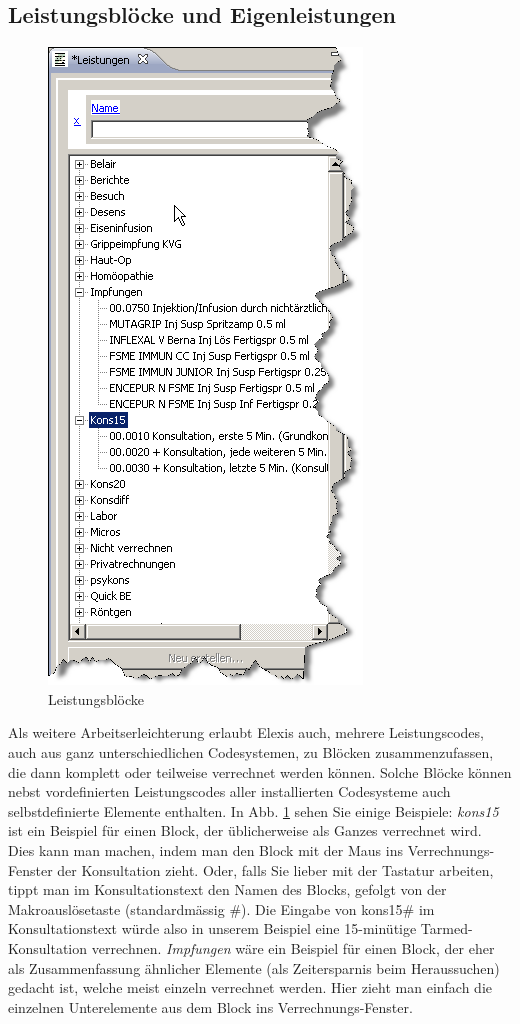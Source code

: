 \subsection{Leistungsblöcke und Eigenleistungen}
\begin{figure}
\includegraphics{images/block1}
\caption{Leistungsblöcke}
\label{fig:bloecke}
\end{figure}
Als weitere Arbeitserleichterung erlaubt Elexis auch, mehrere Leistungscodes, auch aus ganz unterschiedlichen Codesystemen, zu Blöcken zusammenzufassen, die dann komplett oder teilweise verrechnet werden können. Solche Blöcke können nebst vordefinierten Leistungscodes aller installierten Codesysteme auch selbstdefinierte Elemente enthalten. In Abb. \ref{fig:bloecke} sehen Sie einige Beispiele: \textit{kons15} ist ein Beispiel für einen Block, der üblicherweise als Ganzes verrechnet wird. Dies kann man machen, indem man den Block mit der Maus ins Verrechnungs-Fenster der Konsultation zieht. Oder, falls Sie lieber mit der Tastatur arbeiten, tippt man im Konsultationstext den Namen des Blocks, gefolgt von der Makroauslösetaste (standardmässig \#). Die Eingabe von kons15\# im Konsultationstext würde also in unserem Beispiel eine 15-minütige Tarmed-Konsultation verrechnen. \textit{Impfungen} wäre ein Beispiel für einen Block, der eher als Zusammenfassung ähnlicher Elemente (als Zeitersparnis beim Heraussuchen) gedacht ist, welche meist einzeln verrechnet werden. Hier zieht man einfach die einzelnen Unterelemente aus dem Block ins Verrechnungs-Fenster.

